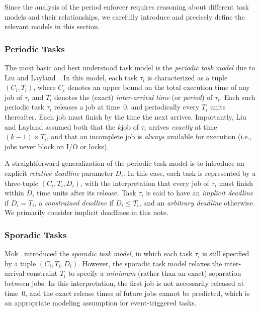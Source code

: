 Since the analysis of the period enforcer requires reasoning about different task models and their relationships, we carefully introduce and precisely define the relevant models in this section.


\subsubsection{Periodic Tasks}

The most basic and best understood task model is the \emph{periodic task model} due to Liu and Layland~\cite{LL:73}. In this model, each task $\tau_i$ is characterized as a tuple $(C_i,T_i)$, where $C_i$ denotes an upper bound on the total execution time of any job of $\tau_i$ and $T_i$ denotes the (exact) \emph{inter-arrival time} (or \emph{period}) of $\tau_i$. Each such periodic task $\tau_i$ releases a job at time~0, and periodically every $T_i$ units thereafter. Each job must finish by the time the next arrives. Importantly, Liu and Layland assumed both that the $k$\xth job of $\tau_i$ arrives \emph{exactly} at time $(k-1)\times T_i$, and that an incomplete job is \emph{always} available for execution (i.e., jobs never block on I/O or locks).

A straightforward generalization of the periodic task model is to introduce an explicit \emph{relative deadline} parameter $D_i$. In this case, each task is represented by a three-tuple $(C_i, T_i, D_i)$, with the interpretation that every job of $\tau_i$ must finish within $D_i$ time units after its release. Task $\tau_i$ is said to have an \emph{implicit deadline}  if $D_i = T_i$, a \emph{constrained deadline} if $D_i \leq T_i$, and an \emph{arbitrary deadline} otherwise. We primarily consider implicit deadlines in this note.

\subsubsection{Sporadic Tasks}

Mok~\cite{Mo:83} introduced the \emph{sporadic task model}, in which each task $\tau_i$ is still specified by a tuple $(C_i, T_i, D_i)$. However, the sporadic task model relaxes the inter-arrival constraint $T_i$ to specify a \emph{minimum} (rather than an exact) separation between jobs. In this interpretation, the first job is not necessarily released at time~0, and the exact release times of future jobs cannot be predicted, which is an appropriate modeling assumption for event-triggered tasks.

